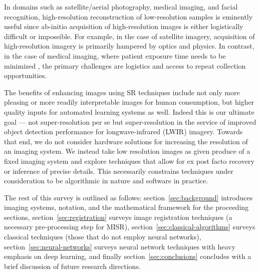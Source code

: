 In domains such as satellite/aerial photography, medical imaging, and facial recognition,
high-resolution reconstruction of low-resolution samples is eminently useful since ab-initio acquisition of high-resolution images is either logistically difficult or impossible.
%
For example, in the case of satellite imagery, acquisition of high-resolution imagery is primarily hampered by optics and physics.
%
In contrast, in the case of medical imaging, where patient exposure time needs to be minimized \cite{doi:10.1002.cmr.a.21249}, the primary challenges are logistics and access to repeat collection opportunities.

The benefits of enhancing images using SR techniques include not only more pleasing or more readily interpretable images for human consumption, but higher quality inputs for automated learning systems as well.
%
Indeed this is our ultimate goal --- not super-resolution per se but super-resolution in the service of improved object detection performance for longwave-infrared (LWIR) imagery.
%
Towards that end, we do not consider hardware solutions for increasing the resolution of an imaging system.
%
We instead take low resolution images as given produce of a fixed imaging system and explore techniques that allow for ex post facto recovery or inference of precise details.
%
This necessarily constrains techniques under consideration to be algorithmic in nature and software in practice.

The rest of this survey is outlined as follows: section~\ref{sec:background} introduces imaging systems, notation, and the mathematical framework for the proceeding sections, section~\ref{sec:registration} surveys image registration techniques (a necessary pre-processing step for MISR), section~\ref{sec:classical-algorithms} surveys classical techniques (those that do not employ neural networks), section~\ref{sec:neural-networks} surveys neural network techniques with heavy emphasis on deep learning, and finally section~\ref{sec:conclusions} concludes with a brief discussion of future research directions.